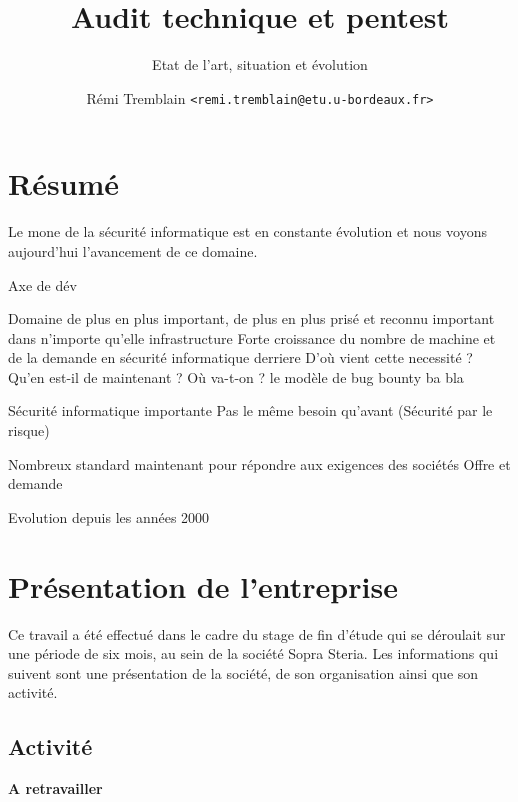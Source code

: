 \documentclass[a4paper]{memoir}
\title{Audit technique et pentest}
\subtitle{Etat de l'art, situation et évolution}
\author{Rémi Tremblain \texttt{<remi.tremblain@etu.u-bordeaux.fr>}}
\begin{document}
\frontmatter%
\maketitle
\thispagestyle{empty}





\chapter*{Résumé}

 Le mone de la sécurité informatique est en constante évolution et nous voyons aujourd'hui l'avancement de ce domaine.

Axe de dév

Domaine de plus en plus important, de plus en plus prisé et reconnu
important dans n'importe qu'elle infrastructure 
Forte croissance du nombre de machine et de la demande en sécurité informatique derriere 
D'où vient cette necessité ? Qu'en est-il de maintenant ? Où va-t-on ? le modèle de bug bounty ba bla

Sécurité informatique importante
Pas le même besoin qu'avant (Sécurité par le risque)

Nombreux standard maintenant pour répondre aux exigences des sociétés
Offre et demande

Evolution depuis les années 2000


\chapter*{Présentation de l'entreprise}

Ce travail a été effectué dans le cadre du stage de fin d'étude qui se déroulait sur une période de six mois, au sein de la société Sopra Steria.
Les informations qui suivent sont une présentation de la société, de son organisation ainsi que son activité.

\section*{Activité}

\textbf{A retravailler}\\
\end{document}
